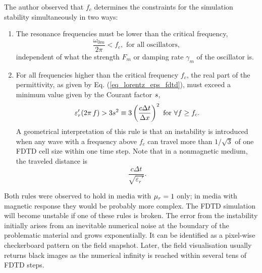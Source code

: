 The author observed that $f_c$ determines the constraints for the simulation stability simultaneously in two ways:
\begin{enumerate}
 \item{The resonance frequencies must be lower than the critical frequency,  %
\begin{equation} \frac{\omega_{0m}}{2\pi} < f_c, \text{ for all oscillators, } %
\end{equation}
independent of what the strength $F_m$ or damping rate $\gamma_m$ of the oscillator is. 
} 
 \item{For all frequencies higher than the critical frequency $f_c$, the real part of the permittivity, as given by Eq. (\ref{eq_lorentz_eps_fdtd}), must exceed a minimum value given by the Courant factor $s$,
\begin{equation} \varepsilon_r'(2\pi\,f) > 3 s^{2} \equiv 3 \left( \frac{c \Delta t}{\Delta x} \right)^{2} \text{ for } \forall f \geq f_c. \label{eq_fdtd_stability_realp}\end{equation}  } %
A geometrical interpretation of this rule is that an instability is introduced when any wave with a frequency above $f_c$ can travel more than $1/\sqrt{3}$ of one FDTD cell size within one time step. 
Note that in a nonmagnetic medium, the traveled distance is $$\frac{c\Delta t}{\sqrt{\varepsilon_r'}}.$$
\end{enumerate}
Both rules were observed to hold in media with $\mu_r = 1$ only; in media with magnetic response they would be probably more complex.
The FDTD simulation will become unstable if one of these rules is broken. The error from the instability initially arises from an inevitable numerical noise at the boundary of the problematic material and grows exponentially. It can be identified as a pixel-wise checkerboard pattern on the field snapshot. Later, the field visualisation usually returns black images as the numerical infinity is reached within several tens of FDTD steps. 

